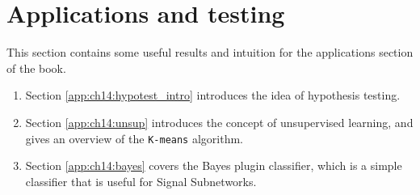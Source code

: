 \chapter{Applications and testing}

This section contains some useful results and intuition for the applications section of the book.

\begin{enumerate}
    \item Section \ref{app:ch14:hypotest_intro} introduces the idea of hypothesis testing.
    \item Section \ref{app:ch14:unsup} introduces the concept of unsupervised learning, and gives an overview of the \texttt{K-means} algorithm.
    \item Section \ref{app:ch14:bayes} covers the Bayes plugin classifier, which is a simple classifier that is useful for Signal Subnetworks.
\end{enumerate}






